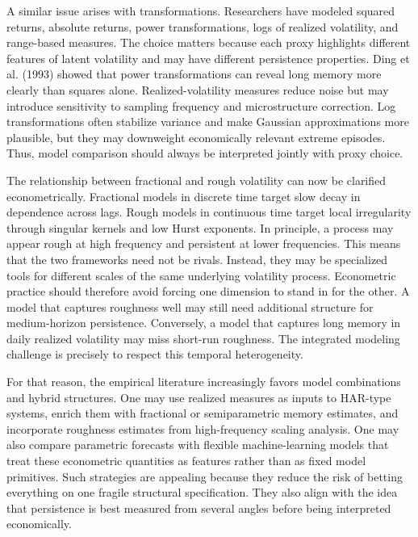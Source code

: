 \documentclass[12pt]{article}
\begin{document}
A similar issue arises with transformations. Researchers have modeled squared returns, absolute returns, power transformations, logs of realized volatility, and range-based measures. The choice matters because each proxy highlights different features of latent volatility and may have different persistence properties. Ding et al. (1993) showed that power transformations can reveal long memory more clearly than squares alone. Realized-volatility measures reduce noise but may introduce sensitivity to sampling frequency and microstructure correction. Log transformations often stabilize variance and make Gaussian approximations more plausible, but they may downweight economically relevant extreme episodes. Thus, model comparison should always be interpreted jointly with proxy choice.

The relationship between fractional and rough volatility can now be clarified econometrically. Fractional models in discrete time target slow decay in dependence across lags. Rough models in continuous time target local irregularity through singular kernels and low Hurst exponents. In principle, a process may appear rough at high frequency and persistent at lower frequencies. This means that the two frameworks need not be rivals. Instead, they may be specialized tools for different scales of the same underlying volatility process. Econometric practice should therefore avoid forcing one dimension to stand in for the other. A model that captures roughness well may still need additional structure for medium-horizon persistence. Conversely, a model that captures long memory in daily realized volatility may miss short-run roughness. The integrated modeling challenge is precisely to respect this temporal heterogeneity.

For that reason, the empirical literature increasingly favors model combinations and hybrid structures. One may use realized measures as inputs to HAR-type systems, enrich them with fractional or semiparametric memory estimates, and incorporate roughness estimates from high-frequency scaling analysis. One may also compare parametric forecasts with flexible machine-learning models that treat these econometric quantities as features rather than as fixed model primitives. Such strategies are appealing because they reduce the risk of betting everything on one fragile structural specification. They also align with the idea that persistence is best measured from several angles before being interpreted economically.
\end{document}

